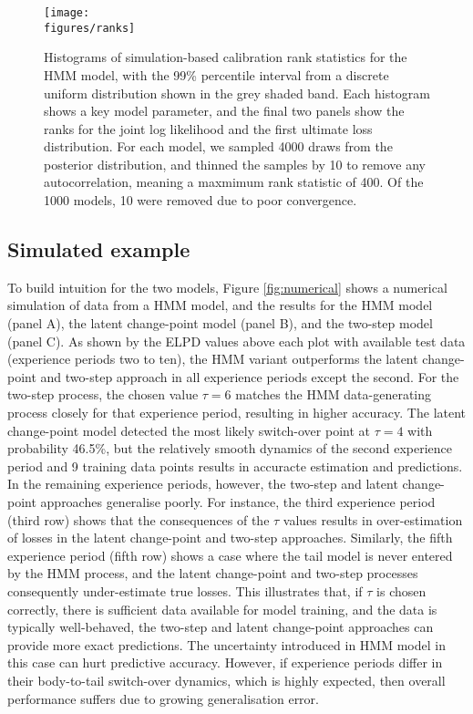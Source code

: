 \begin{figure}
    \centering
    \texttt{[image: \\figures/ranks]}
    \caption{
		Histograms of simulation-based calibration
		rank statistics for the HMM model, 
        with the 99\% percentile
        interval from a discrete uniform distribution
        shown in the grey shaded band.
        Each histogram shows a key model parameter,
        and the final two panels show the ranks
        for the joint log
        likelihood and the first ultimate loss
        distribution.
        For each model, we sampled
        4000 draws from the posterior distribution,
        and thinned the samples by 10 to remove any
        autocorrelation, meaning a maxmimum rank statistic
        of 400. Of the 1000 models,
        10 were removed due to poor convergence.
    }
	\label{fig:sbc}
\end{figure}

\subsection{Simulated example}
To build intuition for the two models,
Figure \ref{fig:numerical} shows a numerical
simulation of data from a HMM model,
and the results for the HMM model
(panel A), the latent change-point
model (panel B), and the
two-step model (panel C).
As shown by the ELPD values above each
plot with available test data (experience
periods two to ten), 
the HMM variant outperforms
the latent change-point and two-step approach
in all
experience periods except the second.
For the two-step process, the chosen value $\tau = 6$
matches the HMM data-generating process
closely for that experience period, 
resulting in higher accuracy. 
The latent change-point model detected the most
likely switch-over point at $\tau = 4$ with probability
46.5\%, but the relatively smooth dynamics of the
second experience period and 9 training data points
results in accuracte estimation and predictions. 
In the remaining experience
periods, however, the two-step and latent change-point approaches
generalise poorly.
For instance, the third experience period (third row)
shows that the consequences of the $\tau$ values results
in over-estimation of losses in the latent change-point
and two-step approaches.
Similarly, the fifth experience period (fifth row)
shows a case where the tail model is never
entered by the HMM process, and the
latent change-point and two-step processes
consequently under-estimate true losses.
This illustrates that,
if $\tau$ is chosen correctly, there is sufficient
data available for model training,
and the data is typically well-behaved,
the two-step and latent change-point approaches 
can provide more exact predictions.
The uncertainty introduced in HMM model in this case
can hurt predictive accuracy.
However, if experience periods differ in their
body-to-tail switch-over dynamics,
which is highly expected, then overall
performance suffers due to
growing generalisation error.

